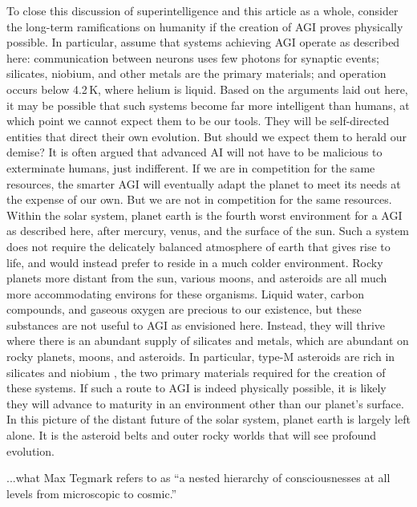 To close this discussion of superintelligence and this article as a whole, consider the long-term ramifications on humanity if the creation of AGI proves physically possible. In particular, assume that systems achieving AGI operate as described here: communication between neurons uses few photons for synaptic events; silicates, niobium, and other metals are the primary materials; and operation occurs below 4.2\,K, where helium is liquid. Based on the arguments laid out here, it may be possible that such systems become far more intelligent than humans, at which point we cannot expect them to be our tools. They will be self-directed entities that direct their own evolution. But should we expect them to herald our demise? It is often argued that advanced AI will not have to be malicious to exterminate humans, just indifferent. If we are in competition for the same resources, the smarter AGI will eventually adapt the planet to meet its needs at the expense of our own. But we are not in competition for the same resources. Within the solar system, planet earth is the fourth worst environment for a AGI as described here, after mercury, venus, and the surface of the sun. Such a system does not require the delicately balanced atmosphere of earth that gives rise to life, and would instead prefer to reside in a much colder environment. Rocky planets more distant from the sun, various moons, and asteroids are all much more accommodating environs for these organisms. Liquid water, carbon compounds, and gaseous oxygen are precious to our existence, but these substances are not useful to AGI as envisioned here. Instead, they will thrive where there is an abundant supply of silicates and metals, which are abundant on rocky planets, moons, and asteroids. In particular, type-M asteroids are rich in silicates \cite{} and niobium \cite{}, the two primary materials required for the creation of these systems. If such a route to AGI is indeed physically possible, it is likely they will advance to maturity in an environment other than our planet's surface. In this picture of the distant future of the solar system, planet earth is largely left alone. It is the asteroid belts and outer rocky worlds that will see profound evolution.

\vspace{1em}
...what Max Tegmark refers to as ``a nested hierarchy of consciousnesses at all levels from microscopic to cosmic.'' \cite{te2017}
 
